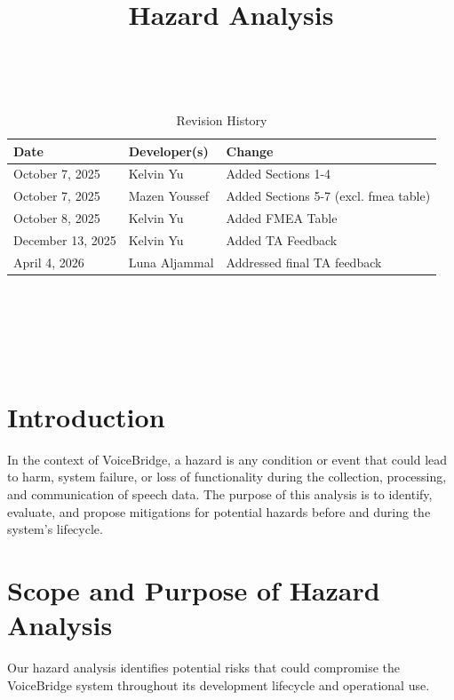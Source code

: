 \documentclass{article}
\title{Hazard Analysis\\\progname}
\author{\authname}
\date{}
\begin{document}
\maketitle
\thispagestyle{empty}

~\newpage


\begin{table}[hp]
\caption{Revision History} \label{TblRevisionHistory}
\begin{tabularx}{\textwidth}{llX}
\toprule
\textbf{Date} & \textbf{Developer(s)} & \textbf{Change}\\
\midrule
October 7, 2025 & Kelvin Yu & Added Sections 1-4\\
October 7, 2025 & Mazen Youssef & Added Sections 5-7 (excl. fmea table)\\
October 8, 2025 & Kelvin Yu & Added FMEA Table\\
December 13, 2025 & Kelvin Yu & Added TA Feedback\\
April 4, 2026 & Luna Aljammal & Addressed final TA feedback \\
\bottomrule
\end{tabularx}
\end{table}

~\newpage

\tableofcontents

~\newpage

\listoftables
~\newpage
~\newpage



\section{Introduction}

In the context of VoiceBridge, a hazard is any condition or event that could lead to harm, system failure, or loss of functionality during the collection, processing, and communication of speech data. 
The purpose of this analysis is to identify, evaluate, and propose mitigations for potential hazards before and during the system’s lifecycle.


\section{Scope and Purpose of Hazard Analysis}

Our hazard analysis identifies potential risks that could compromise the VoiceBridge system throughout its development lifecycle and operational use.
\end{document}

